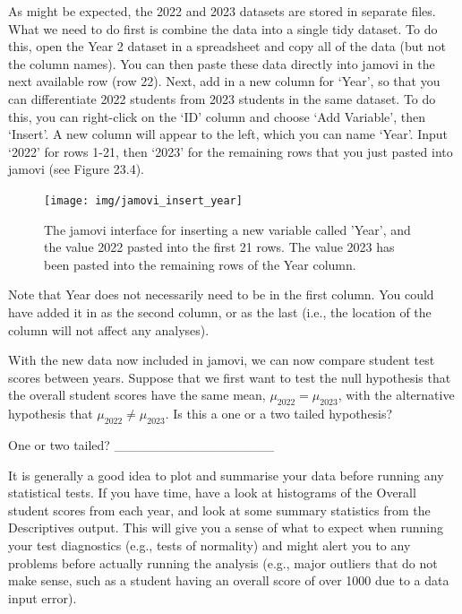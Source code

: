 \documentclass[
]{scrbook}
\begin{document}
As might be expected, the 2022 and 2023 datasets are stored in separate files.
What we need to do first is combine the data into a single tidy dataset.
To do this, open the Year 2 dataset in a spreadsheet and copy all of the data (but not the column names).
You can then paste these data directly into jamovi in the next available row (row 22).
Next, add in a new column for `Year', so that you can differentiate 2022 students from 2023 students in the same dataset.
To do this, you can right-click on the `ID' column and choose `Add Variable', then `Insert'.
A new column will appear to the left, which you can name `Year'.
Input `2022' for rows 1-21, then `2023' for the remaining rows that you just pasted into jamovi (see Figure 23.4).

\begin{figure}
\texttt{[image: img/jamovi\_insert\_year]} \caption{The jamovi interface for inserting a new variable called 'Year', and the value 2022 pasted into the first 21 rows. The value 2023 has been pasted into the remaining rows of the Year column.}\label{fig:unnamed-chunk-105}
\end{figure}

Note that Year does not necessarily need to be in the first column.
You could have added it in as the second column, or as the last (i.e., the location of the column will not affect any analyses).

With the new data now included in jamovi, we can now compare student test scores between years.
Suppose that we first want to test the null hypothesis that the overall student scores have the same mean, \(\mu_{2022} = \mu_{2023}\), with the alternative hypothesis that \(\mu_{2022} \neq \mu_{2023}\).
Is this a one or a two tailed hypothesis?

One or two tailed? \_\_\_\_\_\_\_\_\_\_\_\_\_\_\_\_\_

It is generally a good idea to plot and summarise your data before running any statistical tests.
If you have time, have a look at histograms of the Overall student scores from each year, and look at some summary statistics from the Descriptives output.
This will give you a sense of what to expect when running your test diagnostics (e.g., tests of normality) and might alert you to any problems before actually running the analysis (e.g., major outliers that do not make sense, such as a student having an overall score of over 1000 due to a data input error).
\end{document}
